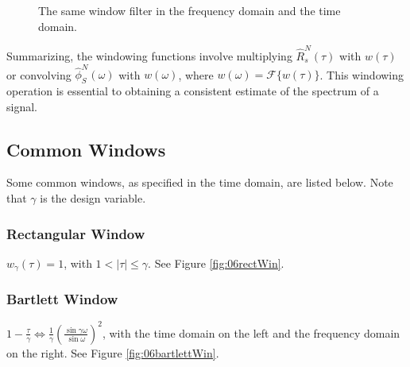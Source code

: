 \documentclass[lecture,12pt,]{pcms-l}
\theoremstyle{example}
\newcommand{\w}{\omega}
\begin{document}
\begin{figure}[ht!]
	\centering
	 \hfill
	\caption{The same window filter in the  frequency domain and the  time domain.}
	\label{fig:06windowfilter}
\end{figure}

Summarizing, the windowing functions involve multiplying $\hat{R}_s^N(\tau)$ with $w(\tau)$ or convolving $\hat{\phi}_S^N(\w)$ with $w(\w)$, where $w(\w)=\mathcal{F}\{w(\tau)\}$. This windowing operation is essential to obtaining a consistent estimate of the spectrum of a signal.

\subsection{Common Windows}
Some common windows, as specified in the time domain, are listed below. Note that $\gamma$ is the design variable.

\subsubsection{Rectangular Window}
$w_\gamma(\tau) = 1$, with $1<|\tau|\leq\gamma$. See Figure \ref{fig:06rectWin}.

\subsubsection{Bartlett Window}
$1-\frac{\tau}{\gamma} \Leftrightarrow \frac{1}{\gamma}\left(\frac{\sin\gamma\w}{\sin\w}\right)^2$, with the time domain on the left and the frequency domain on the right. See Figure \ref{fig:06bartlettWin}.
\end{document}
